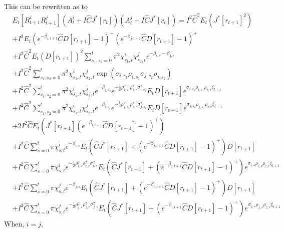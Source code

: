 This can be rewritten as to 
\begin{align*}
&E_t[R_{t+1}^i  R_{t+1}^j] (A_t^i + I \hat C J^*[r_t])(A_t^j + I \hat C J^*[r_t])  =I^2 \hat C^2 E_t(J^*[r_{t+1}]^2) \\
&+I^2 E_t ( e^{- \beta_{i, t+1}} \hat C D[r_{t+1}] - 1)^+ ( e^{- \beta_{j, t+1}} \hat C D[r_{t+1}] - 1)^+   \\
&+ I^2 \hat C^2 E_t (D[r_{t+1}])^2 \sum_{s_1, s_2 = 0}^t \pi^2\chi_{s_1, t}^i \chi_{s_2, t}^j  e^{- \beta_{i, s} - \beta_{j, s}}  \\
& + I^2 \hat C^2  \sum_{s_1, s_2 = 0}^t \pi^2\chi_{s_1, t}^i \chi_{s_2, t}^j\exp( \sigma_{i, s_1} \rho_{i, s_1}  \sigma_{j, s_2} \rho_{j, s_2} ) \\
& + I^2 \hat C^2 \sum_{s_1, s_2 = 0}^t \pi^2 \chi_{s_1, t}^i \chi_{s_2, t}^j e^{- \beta_{j, s_2}} e^{ - \frac{1}{2}\rho_{i, s_1}^2  \rho_{z,r}^2 \sigma_{i, s_1}^2 } E_t D[r_{t+1}]  e^{ \sigma_{i, s_1} \rho_{i, s_1} \rho_{z, r} \xi_{t+1} } \\
&+ I^2 \hat C^2 \sum_{s_1, s_2 = 0}^t \pi^2 \chi_{s_1, t}^i \chi_{s_2, t}^j  e^{- \beta_{i, s_1}} e^{ - \frac{1}{2}\rho_{j, s_2}^2 \rho_{z, r}^2\sigma_{j, s_2}^2} E_t D[r_{t+1}] e^{\sigma_{j, s_2} \rho_{j, s_2} \rho_{z, r} \xi_{t+1} } \\
&+ 2I^2 \hat C  E_t (J^*[r_{t+1}] (e^{- \beta_{i, t+1}} \hat C D[r_{t+1}] - 1)^+ )  \\
&+ I^2 \hat C \sum_{s = 0}^t \pi\chi_{s, t}^i  e^{- \beta_{i, s}}E_t (\hat C J^*[r_{t+1}]  + ( e^{- \beta_{j, t+1}} \hat C D[r_{t+1}] - 1)^+) D[r_{t+1}]\\
&+ I^2 \hat C \sum_{s = 0}^t \pi\chi_{s, t}^i e^{ - \frac{1}{2}\rho_{i, s}^2 \rho_{z, r}^2 \sigma_{i, s}^2} E_t (\hat C J^*[r_{t+1}]  + ( e^{- \beta_{j, t+1}} \hat C D[r_{t+1}] - 1)^+)  e^{\sigma_{i, s} \rho_{i, s} \rho_{z, r}\xi_{t+1} }   \\
&+ I^2 \hat C \sum_{s = 0}^t \pi\chi_{s, t}^j  e^{- \beta_{j, s}}E_t ( \hat C J^*[r_{t+1}]  + ( e^{- \beta_{i, t+1}} \hat C D[r_{t+1}] - 1)^+)D[r_{t+1}] \\
&+I^2 \hat C \sum_{s = 0}^t \pi\chi_{s, t}^j e^{ - \frac{1}{2}\rho_{j, s}^2 \rho_{z, r}^2\sigma_{j, s}^2} E_t (\hat C J^*[r_{t+1}]  + ( e^{- \beta_{i, t+1}} \hat C D[r_{t+1}] - 1)^+) e^{\sigma_{j, s} \rho_{j, s} \rho_{z, r} \xi_{t+1} }
\end{align*}
When, $i = j,$
